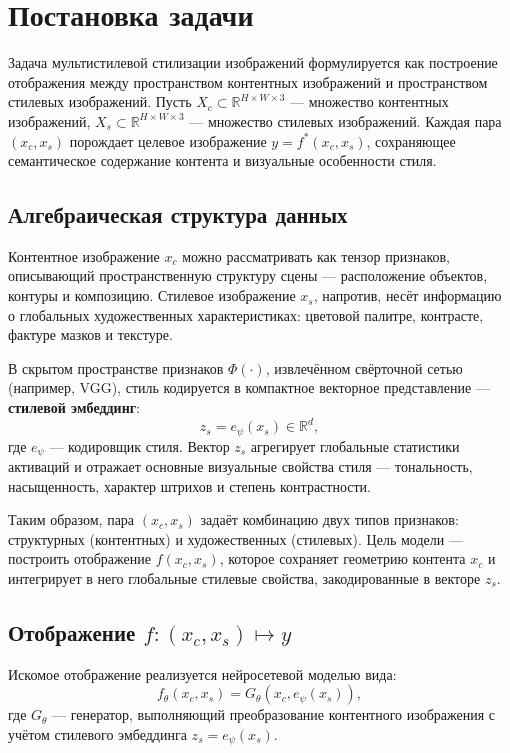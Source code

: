 \documentclass{article}
\begin{document}
\section{Постановка задачи}

Задача мультистилевой стилизации изображений формулируется как построение отображения между пространством контентных изображений и пространством стилевых изображений. Пусть  
$X_c \subset \mathbb{R}^{H \times W \times 3}$ — множество контентных изображений,  
$X_s \subset \mathbb{R}^{H \times W \times 3}$ — множество стилевых изображений.  
Каждая пара $(x_c, x_s)$ порождает целевое изображение $y = f^*(x_c, x_s)$, сохраняющее семантическое содержание контента и визуальные особенности стиля.

\subsection*{Алгебраическая структура данных}

Контентное изображение $x_c$ можно рассматривать как тензор признаков, описывающий пространственную структуру сцены — расположение объектов, контуры и композицию.  
Стилевое изображение $x_s$, напротив, несёт информацию о глобальных художественных характеристиках: цветовой палитре, контрасте, фактуре мазков и текстуре.  

В скрытом пространстве признаков $\Phi(\cdot)$, извлечённом свёрточной сетью (например, VGG), стиль кодируется в компактное векторное представление — \textbf{стилевой эмбеддинг}:
$$
z_s = e_\psi(x_s) \in \mathbb{R}^d,
$$
где $e_\psi$ — кодировщик стиля.  
Вектор $z_s$ агрегирует глобальные статистики активаций и отражает основные визуальные свойства стиля — тональность, насыщенность, характер штрихов и степень контрастности.  

Таким образом, пара $(x_c, x_s)$ задаёт комбинацию двух типов признаков: структурных (контентных) и художественных (стилевых).  
Цель модели — построить отображение $f(x_c, x_s)$, которое сохраняет геометрию контента $x_c$ и интегрирует в него глобальные стилевые свойства, закодированные в векторе $z_s$.

\subsection*{Отображение $f : (x_c, x_s) \mapsto y$}

Искомое отображение реализуется нейросетевой моделью вида:
$$
f_\theta(x_c, x_s) = G_\theta(x_c, e_\psi(x_s)),
$$
где $G_\theta$ — генератор, выполняющий преобразование контентного изображения с учётом стилевого эмбеддинга $z_s = e_\psi(x_s)$.  
\end{document}
